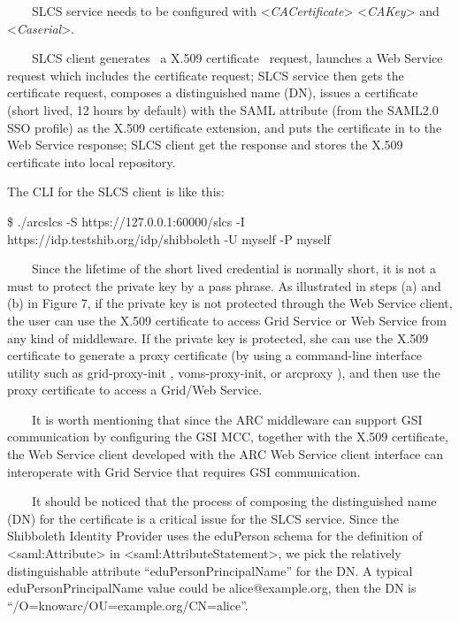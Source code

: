 \documentclass{article}
\newcounter{Figure}
\begin{document}
{\color{black}
\ \ \ \ SLCS service needs to be configured with
{\textless}\textit{CACertificate}{\textgreater}
{\textless}\textit{CAKey}{\textgreater} and
{\textless}\textit{Caserial}{\textgreater}.}

{\color{black}
\ \ \ \ SLCS client generates \ a X.509 certificate \ request, launches
a Web Service request which includes the certificate request; SLCS
service then gets the certificate request, composes a distinguished
name (DN), issues a certificate (short lived, 12 hours by default) with
the SAML attribute (from the SAML2.0 SSO profile) as the X.509
certificate extension, and puts the certificate in to the Web Service
response; SLCS client get the response and stores the X.509 certificate
into local repository.}

{\color{black}
The CLI for the SLCS client is like this:}

{\ttfamily\color{black}
\$ ./arcslcs -S https://127.0.0.1:60000/slcs -I
https://idp.testshib.org/idp/shibboleth -U myself -P myself}

{\color{black}
\ \ \ \ Since the lifetime of the short lived credential is normally
short, it is not a must to protect the private key by a pass phrase. As
illustrated in steps (a) and (b) in Figure 7, if the private key is not
protected through the Web Service client, the user can use the X.509
certificate to access Grid Service or Web Service from any kind of
middleware. If the private key is protected, she can use the X.509
certificate to generate a proxy certificate (by using a command-line
interface utility such as grid-proxy-init , voms-proxy-init, or
arcproxy ), and then use the proxy certificate to access a Grid/Web
Service.}

{\color{black}
\ \ \ \ It is worth mentioning that since the ARC middleware can support
GSI communication by configuring the GSI MCC, together with the X.509
certificate, the Web Service client developed with the ARC Web Service
client interface can interoperate with Grid Service that requires GSI
communication.}

{\color{black}
\ \ \ \ It should be noticed that the process of composing the
distinguished name (DN) for the certificate is a critical issue for the
SLCS service. Since the Shibboleth Identity Provider uses the eduPerson
schema for the definition of {\textless}saml:Attribute{\textgreater} in
{\textless}saml:AttributeStatement{\textgreater}, we pick the
relatively distinguishable attribute
{\textquotedblleft}eduPersonPrincipalName{\textquotedblright} for the
DN. A typical eduPersonPrincipalName value could be alice@example.org,
then the DN is
{\textquotedblleft}/O=knowarc/OU=example.org/CN=alice{\textquotedblright}.}
\end{document}
